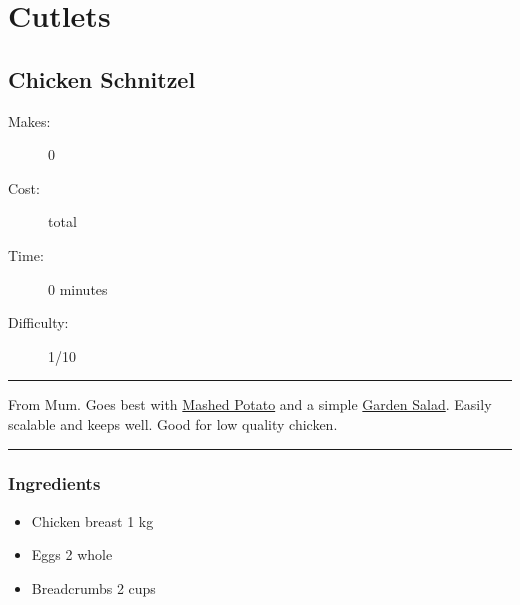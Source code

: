\documentclass[]{article}
\begin{document}
\section*{\center\Huge\color{accent}Cutlets}
\label{cat:Cutlets}
\label{rec:Chicken Schnitzel}
\subsection*{\center\huge Chicken Schnitzel}
\begin{description}
\item[Makes:] 0 
\item[Cost:]  total
\item[Time:] 0 minutes
\item[Difficulty:] 1/10
\end{description}
\vspace{0.2cm}\hrule\vspace{0.5cm}
\begin{adjustwidth}{0.5 cm}{0.5 cm}

From Mum. Goes best with \hyperref[rec:Mashed Potato]{Mashed Potato} and a simple \hyperref[rec:Garden Salad]{Garden Salad}. Easily scalable and keeps well. Good for low quality chicken. \hfill{}\color{black}

\end{adjustwidth}
\vspace{0.5cm}\hrule
\subsubsection*{\Large Ingredients}
\begin{multicols}{2}
\begin{itemize}
 \item Chicken breast \hfill 1 kg
 \item Eggs \hfill 2 whole
 \item Breadcrumbs \hfill 2 cups
\end{itemize}
\end{multicols}
\end{document}
